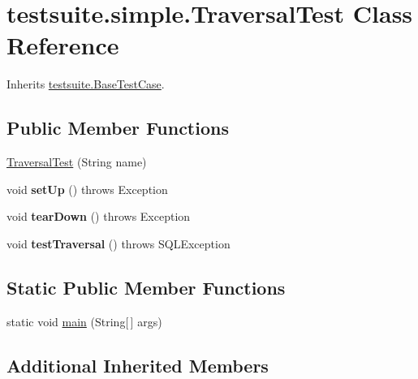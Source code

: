 \hypertarget{classtestsuite_1_1simple_1_1_traversal_test}{}\section{testsuite.\+simple.\+Traversal\+Test Class Reference}
\label{classtestsuite_1_1simple_1_1_traversal_test}


Inherits \mbox{\hyperlink{classtestsuite_1_1_base_test_case}{testsuite.\+Base\+Test\+Case}}.

\subsection*{Public Member Functions}
\begin{DoxyCompactItemize}
\item 
\mbox{\hyperlink{classtestsuite_1_1simple_1_1_traversal_test_aab43c85339e7f465ad57bb3db55b6649}{Traversal\+Test}} (String name)
\item 
\mbox{\label{classtestsuite_1_1simple_1_1_traversal_test_a4715980c14675baf75ed7cbbacc2f7b5}} 
void {\bfseries set\+Up} ()  throws Exception 
\item 
\mbox{\label{classtestsuite_1_1simple_1_1_traversal_test_a8f7344c09351c45f90dd4b8b9be3be40}} 
void {\bfseries tear\+Down} ()  throws Exception 
\item 
\mbox{\label{classtestsuite_1_1simple_1_1_traversal_test_a7a7160b9550ff25b80370eed85097efb}} 
void {\bfseries test\+Traversal} ()  throws S\+Q\+L\+Exception 
\end{DoxyCompactItemize}
\subsection*{Static Public Member Functions}
\begin{DoxyCompactItemize}
\item 
static void \mbox{\hyperlink{classtestsuite_1_1simple_1_1_traversal_test_a26e0a3c13820f4daedefe73785a7fde8}{main}} (String\mbox{[}$\,$\mbox{]} args)
\end{DoxyCompactItemize}
\subsection*{Additional Inherited Members}



